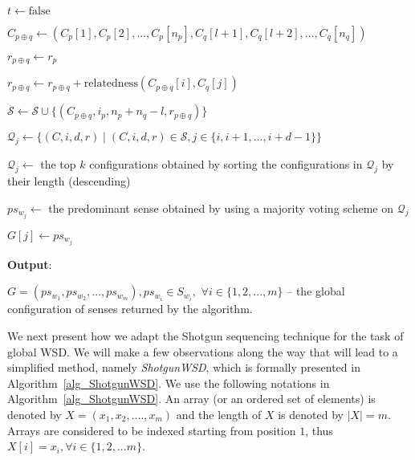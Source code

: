 \documentclass[11pt]{article}
\begin{document}
\begin{algorithm*}[!th]
{{{{{								
								{
										{
												$t \leftarrow \mbox{false}$\;
										}
								}
								
								{
										$C_{p \oplus q} \leftarrow (C_p[1],C_p[2],..., C_p[n_p], C_q[l+1],C_q[l+2],...,C_q[n_q])$\;
									
										$r_{p \oplus q} \leftarrow r_p$\;
									
										{
												{
													$r_{p \oplus q} \leftarrow r_{p \oplus q} + \mbox{relatedness}(C_{p \oplus q}[i], C_q[j])$\;
												}
										}
									
										$\mathcal{S} \leftarrow \mathcal{S} \cup \{(C_{p \oplus q}, i_p, n_p + n_q - l, r_{p \oplus q})\}$\;
								}
						}
				}
		}
}

{
		$\mathcal{Q}_j \leftarrow \lbrace (C, i, d, r) \mid (C, i, d, r) \in \mathcal{S}, j \in \{i,i+1,...,i+d-1\} \rbrace$\;		
		
		$\mathcal{Q}_j \leftarrow$ the top $k$ configurations obtained by sorting the configurations in $\mathcal{Q}_j$ by their length (descending)\;
		
		$ps_{w_j} \leftarrow$ the predominant sense obtained by using a majority voting scheme on $\mathcal{Q}_j$\;
		
		$G[j] \leftarrow ps_{w_j}$\;
}

\BlankLine
\textbf{Output}: 

$G = (ps_{w_1}, ps_{w_2},..., ps_{w_m}), ps_{w_i} \in S_{w_i},$ $\forall i \in \{1,2,...,m\}$ -- the global configuration of senses returned by the algorithm.
}
\end{algorithm*}
We next present how we adapt the Shotgun sequencing technique for the task of global WSD. We will make a few observations along the way that will lead to a simplified method, namely \emph{ShotgunWSD}, which is formally presented in Algorithm~\ref{alg_ShotgunWSD}. We use the following notations in Algorithm~\ref{alg_ShotgunWSD}. An array (or an ordered set of elements) is denoted by $X = (x_1, x_2,....,x_m)$ and the length of $X$ is denoted by $|X| = m$. Arrays are considered to be indexed starting from position $1$, thus $X[i] = x_i, \forall i \in \{1,2,...m\}$. 
\end{document}
